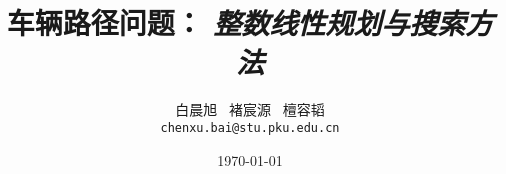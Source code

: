 \documentclass[12pt, a4paper]{article}
\title{车辆路径问题： \emph{整数线性规划与搜索方法}}
\author{
    白晨旭 \, 褚宸源 \, 檀容韬 \\
    {\tt\small chenxu.bai@stu.pku.edu.cn}
}
\date{\today}
\begin{document}
\maketitle

\url{}






\newpage
{
    \small
    
    
}
\end{document}

